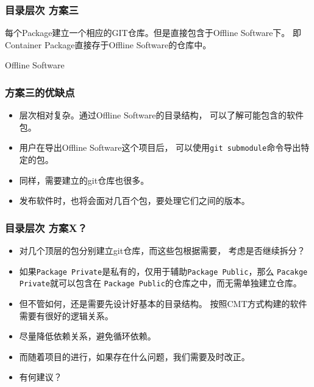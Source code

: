 \begin{frame}
    \frametitle{目录层次 方案三}
    每个Package建立一个相应的GIT仓库。但是直接包含于Offline Software下。
    即Container Package直接存于Offline Software的仓库中。
    \renewcommand*\DTstylecomment{\rmfamily\color{red}\textsc}
    \begin{block}{Offline Software}
    \end{block}
\end{frame}

\begin{frame}
    \frametitle{方案三的优缺点}
    \begin{itemize}
        \item 层次相对复杂。通过Offline Software的目录结构，
              可以了解可能包含的软件包。
        \item 用户在导出Offline Software这个项目后，
              可以使用{\tt git submodule}命令导出特定的包。
        \item 同样，需要建立的git仓库也很多。
        \item 发布软件时，也将会面对几百个包，要处理它们之间的版本。
    \end{itemize}
\end{frame}

\begin{frame}
    \frametitle{目录层次 方案X？}
    \begin{itemize}
        \item 对几个顶层的包分别建立git仓库，而这些包根据需要，
              考虑是否继续拆分？
        \item 如果{\tt Package Private}是私有的，仅用于辅助{\tt Package Public}，那么
              {\tt Pacakge Private}就可以包含在
              {\tt Package Public}的仓库之中，而无需单独建立仓库。
        \item 但不管如何，还是需要先设计好基本的目录结构。
              按照CMT方式构建的软件需要有很好的逻辑关系。
        \item 尽量降低依赖关系，避免循环依赖。
        \item 而随着项目的进行，如果存在什么问题，我们需要及时改正。
        \item 有何建议？
    \end{itemize}
\end{frame}
